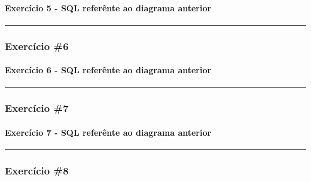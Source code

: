 \documentclass[
]{book}
\makeatletter
\newcommand*\pandocbounded[1]{%
  \sbox\pandoc@box{#1}%
  \Gscale@div\@tempa{\textheight}{\dimexpr\ht\pandoc@box+\dp\pandoc@box\relax}%
  \Gscale@div\@tempb{\linewidth}{\wd\pandoc@box}%
  \ifdim\@tempb\p@<\@tempa\p@\let\@tempa\@tempb\fi%
  \ifdim\@tempa\p@<\p@\scalebox{\@tempa}{\usebox\pandoc@box}%
  \else\usebox{\pandoc@box}%
  \fi%
}
\makeatother
\begin{document}
\pandocbounded{}

\paragraph{Exercício 5 - SQL referênte ao diagrama anterior}\label{exercuxedcio-5---sql-referuxeante-ao-diagrama-anterior}

\begin{center}\rule{0.5\linewidth}{0.5pt}\end{center}

\subsubsection{Exercício \#6}\label{exercuxedcio-6}

\pandocbounded{}

\paragraph{Exercício 6 - SQL referênte ao diagrama anterior}\label{exercuxedcio-6---sql-referuxeante-ao-diagrama-anterior}

\begin{center}\rule{0.5\linewidth}{0.5pt}\end{center}

\subsubsection{Exercício \#7}\label{exercuxedcio-7}

\pandocbounded{}

\paragraph{Exercício 7 - SQL referênte ao diagrama anterior}\label{exercuxedcio-7---sql-referuxeante-ao-diagrama-anterior}

\begin{center}\rule{0.5\linewidth}{0.5pt}\end{center}

\subsubsection{Exercício \#8}\label{exercuxedcio-8}
\end{document}
